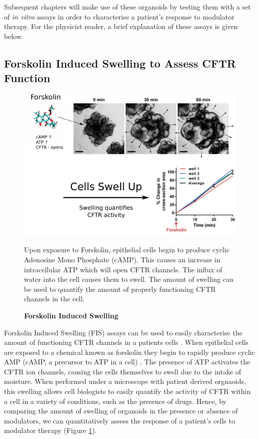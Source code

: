 Subsequent chapters will make use of these organoids by testing them with a set of \textit{in vitro} assays in order to characterise a patient's response to modulator therapy. For the physicist reader, a brief explanation of these assays is given below.

\subsection{Forskolin Induced Swelling to Assess CFTR Function}

\begin{figure}
	\begin{center}
	\includegraphics[width=1\textwidth]{figures/FIS_demo.pdf}
	\end{center}
	\captionsetup{singlelinecheck = false, justification=raggedright}
\caption[Forskolin Induced Swelling] {\textbf{Forskolin Induced Swelling}}{Upon exposure to Forskolin, epithelial cells begin to produce cyclic Adenosine Mono Phosphate (cAMP). This causes an increase in intracellular ATP which will open CFTR channels. The influx of water into the cell causes them to swell. The amount of swelling can be used to quantify the amount of properly functioning CFTR channels in the cell.} 
	\label{FIS_figure}
\end{figure}
Forskolin Induced Swelling (FIS) assays can be used to easily characterise the amount of functioning CFTR channels in a patients cells \cite{dekkers2013}. When epithelial cells are exposed to a chemical known as forskolin they begin to rapidly produce cyclic AMP (cAMP, a precursor to ATP in a cell) \cite{bonora2012}. The presence of ATP activates the CFTR ion channels, causing the cells themselves to swell due to the intake of moisture. When performed under a microscope with patient derived orgnaoids, this swelling allows cell biologists to easily quantify the activity of CFTR within a cell in a variety of conditions, such as the presence of drugs.
Hence, by comparing the amount of swelling of organoids in the presence or absence of modulators, we can quantitatively assess the response of a patient's cells to modulator therapy (Figure \ref{FIS_figure}). 

